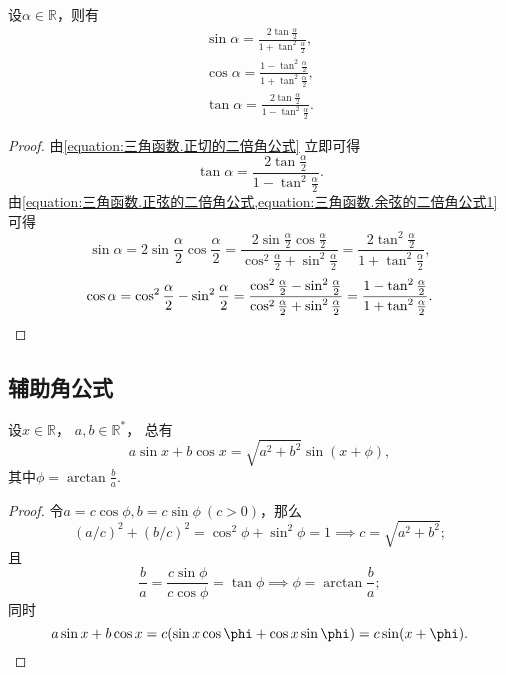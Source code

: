 \begin{proposition}[万能公式]
\def\HalfAlpha{\frac\alpha2}
设\(\alpha\in\mathbb{R}\)，则有
\begin{gather}
	\sin\alpha = \frac{2 \tan\HalfAlpha}{1+\tan^2\HalfAlpha},
		\label{equation:三角函数.万能公式1} \\
	\cos\alpha = \frac{1-\tan^2\HalfAlpha}{1+\tan^2\HalfAlpha},
		\label{equation:三角函数.万能公式2} \\
	\tan\alpha = \frac{2 \tan\HalfAlpha}{1-\tan^2\HalfAlpha}.
		\label{equation:三角函数.万能公式3}
\end{gather}
\begin{proof}
由\cref{equation:三角函数.正切的二倍角公式} 立即可得\[
	\tan\alpha
	=\frac{2\tan\HalfAlpha}{1-\tan^2\HalfAlpha}.
\]
由\cref{equation:三角函数.正弦的二倍角公式,equation:三角函数.余弦的二倍角公式1} 可得\[
	\sin\alpha
	=2\sin\HalfAlpha\cos\HalfAlpha
	=\frac{2\sin\HalfAlpha\cos\HalfAlpha}{\cos^2\HalfAlpha+\sin^2\HalfAlpha}
	=\frac{2\tan^2\HalfAlpha}{1+\tan^2\HalfAlpha},
\]\[
	\cos\alpha
	=\cos^2\HalfAlpha-\sin^2\HalfAlpha
	=\frac{\cos^2\HalfAlpha-\sin^2\HalfAlpha}{\cos^2\HalfAlpha+\sin^2\HalfAlpha}
	=\frac{1-\tan^2\HalfAlpha}{1+\tan^2\HalfAlpha}.
	\qedhere
\]
\end{proof}
\end{proposition}

\subsection{辅助角公式}
\begin{proposition}[辅助角公式]
设\(x\in\mathbb{R}\)，
\(a,b\in\mathbb{R}^*\)，
总有
\begin{equation}
	a \sin x + b \cos x = \sqrt{a^2 + b^2} \sin(x + \phi),
\end{equation}
其中\(\phi = \arctan\frac{b}{a}\).
\begin{proof}
令\(a = c \cos\phi,
b = c \sin\phi\ (c>0)\)，那么
\[
	\left(a/c\right)^2+\left(b/c\right)^2
	=\cos^2\phi+\sin^2\phi
	=1
	\implies
	c = \sqrt{a^2+b^2};
\]
且\[
	\frac{b}{a} = \frac{c \sin\phi}{c \cos\phi} = \tan\phi
	\implies
	\phi = \arctan\frac{b}{a};
\]
同时
\[
	a \sin x + b \cos x
	= c (\sin x \cos\phi + \cos x \sin\phi)
	= c \sin(x+\phi).
	\qedhere
\]
\end{proof}
\end{proposition}

